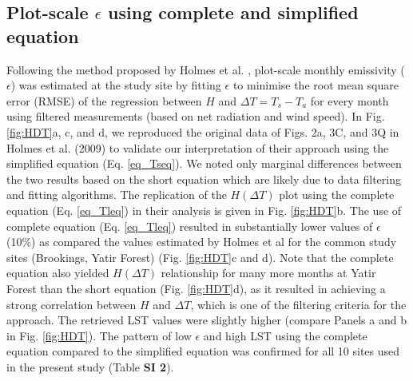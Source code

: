 \documentclass[fleqn,10pt]{wlscirep}
\begin{document}
\subsection{Plot-scale $\epsilon$ using complete and simplified equation}

Following the method proposed by Holmes et al. \cite{holmes_land_2009, holmes_cloud_2016}, plot-scale monthly emissivity ($\epsilon$) was estimated at the study site by fitting $\epsilon$ to minimise the root mean square error (RMSE) of the regression between $H$ and $\Delta T = T_s - T_a$ for every month using filtered measurements (based on net radiation  and wind speed). In Fig. \ref{fig:HDT}a, c, and d, we reproduced the original data of Figs. 2a, 3C, and 3Q in Holmes et al. (2009) \cite{holmes_land_2009} to validate our interpretation of their approach using the simplified equation (Eq. \ref{eq_Tseq}). We noted only marginal differences between the two results based on the short equation which are likely due to data filtering and fitting algorithms. The replication of the $H (\Delta T)$ plot using the complete equation (Eq. \ref{eq_Tleq}) in their analysis is given in Fig. \ref{fig:HDT}b. The use of complete equation (Eq. \ref{eq_Tleq}) resulted in substantially lower values of $\epsilon$ (10\%) as compared the values estimated by Holmes et al\cite{holmes_land_2009} for the common study sites (Brookings, Yatir Forest) (Fig. \ref{fig:HDT}c and d). Note that the complete equation also yielded $H(\Delta T)$ relationship for many more months at Yatir Forest than the short equation (Fig. \ref{fig:HDT}d), as it resulted in achieving a strong correlation between $H$ and $\Delta T$, which is one of the filtering criteria for the approach. The retrieved LST values were slightly higher (compare Panels a and b in Fig. \ref{fig:HDT}). The pattern of low $\epsilon$ and high LST using the complete equation compared to the simplified equation was confirmed for all 10 sites used in the present study (Table \textbf{SI 2}).
\end{document}
